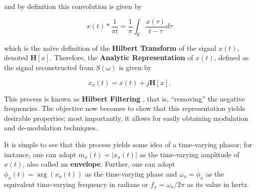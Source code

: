 	\noindent and by definition this convolution is given by

\begin{equation} x(t) * \dfrac{1}{\pi t} = \dfrac{1}{\pi}\int_\mathbb{R} \dfrac{x\left(\tau\right)}{t-\tau} d\tau \label{eq:hilb_transf_def}\end{equation}

	\noindent which is the naïve definition of the \textbf{Hilbert Transform} of the signal $x(t)$, denoted $\mathbf{H}\left[x\right]$. Therefore, the \textbf{Analytic Representation} of $x(t)$, defined as the signal reconstructed from $S\left(\omega\right)$ is given by

\begin{equation} x_a(t) = x(t) + j\mathbf{H}\left[x\right] .\end{equation}

	This process is known as \textbf{Hilbert Filtering} , that is, ``removing'' the negative frequencies. The objective now becomes to show that this representation yields desirable properties; most importantly, it allows for easily obtaining modulation and de-modulation techniques.

	It is simple to see that this process yields some idea of a time-varying phasor; for instance, one can adopt $m_x(t) = \left\lvert x_a(t)\right\rvert$ as the time-varying amplitude of $x(t)$, also called an \textbf{envelope}. Further, one can adopt $\phi_x(t) = \arg\left(x_a(t)\right)$ as the time-varying phase and $\omega_x = \dot{\phi_x}$ as the equivalent time-varying frequency in radians or $f_x = \omega_a/2\pi$ as its value in hertz.

